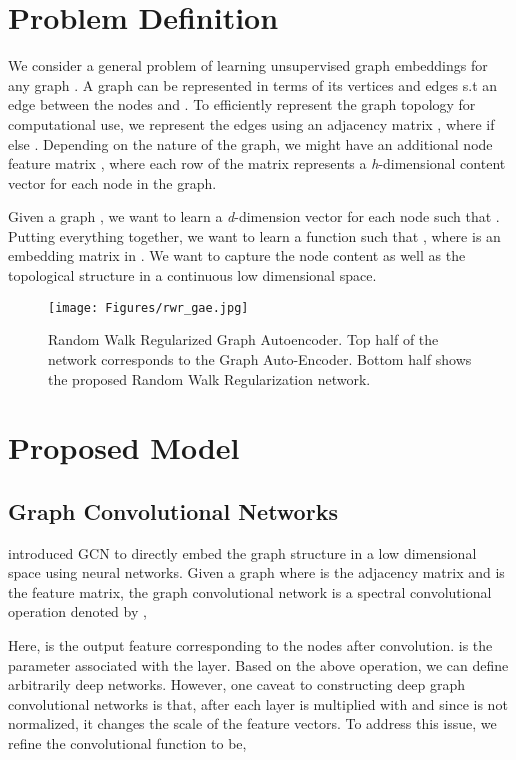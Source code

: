 \documentclass{article}
\begin{document}
\section{Problem Definition}
We consider a general problem of learning unsupervised graph embeddings for any graph . A graph  can be represented in terms of its vertices  and edges  s.t  an edge between the nodes  and . To efficiently represent the graph topology for computational use, we represent the edges using an adjacency matrix , where  if  else . Depending on the nature of the graph, we might have an additional node feature matrix , where each row of the matrix represents a \textit{h}-dimensional content vector for each node in the graph.

Given a graph , we want to learn a \textit{d}-dimension vector for each node  such that . Putting everything together, we want to learn a function  such that , where  is an embedding matrix in . We want  to capture the node content as well as the topological structure in a continuous low dimensional space.

\begin{figure*}[h]
\centering
\texttt{[image: Figures/rwr\_gae.jpg]}
\caption{Random Walk Regularized Graph Autoencoder. Top half of the network corresponds to the Graph Auto-Encoder. Bottom half shows the proposed Random Walk Regularization network. \label{arch}}
\end{figure*}

\section{Proposed Model}
\subsection{Graph Convolutional Networks}
\cite{kipf2016semi} introduced GCN to directly embed the graph structure in a low dimensional space using neural networks. Given a graph  where  is the adjacency matrix and  is the feature matrix, the graph convolutional network is a spectral convolutional operation denoted by ,

Here,  is the output feature corresponding to the nodes after  convolution.  is the parameter associated with the  layer. Based on the above operation, we can define arbitrarily deep networks. However, one caveat to constructing deep graph convolutional networks is that, after each layer  is multiplied with  and since  is not normalized, it changes the scale of the feature vectors. To address this issue, we refine the convolutional function to be,
\end{document}
